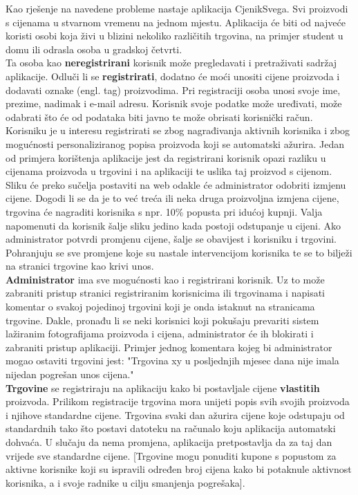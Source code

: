 		Kao rješenje na navedene probleme nastaje aplikacija CjenikSvega. Svi proizvodi s cijenama u stvarnom vremenu na jednom mjestu. Aplikacija će biti od najveće koristi osobi koja živi u blizini nekoliko različitih trgovina, na primjer student u domu ili odrasla osoba u gradskoj četvrti.\\
		
		Ta osoba kao \textbf{neregistrirani} korisnik može pregledavati i pretraživati sadržaj aplikacije. Odluči li se \textbf{registrirati}, dodatno će moći unositi cijene proizvoda i dodavati oznake (engl. tag) proizvodima. Pri registraciji osoba unosi svoje ime, prezime, nadimak i e-mail adresu. Korisnik svoje podatke može uređivati, može odabrati što će od podataka biti javno te može obrisati korisnički račun. Korisniku je u interesu registrirati se zbog nagrađivanja aktivnih korisnika i zbog mogućnosti personaliziranog popisa proizvoda koji se automatski ažurira. Jedan od primjera korištenja aplikacije jest da registrirani korisnik opazi razliku u cijenama proizvoda u trgovini i na aplikaciji te uslika taj proizvod s cijenom. Sliku će preko sučelja postaviti na web odakle će administrator odobriti izmjenu cijene. Dogodi li se da je to već treća ili neka druga proizvoljna izmjena cijene, trgovina će nagraditi korisnika s npr. 10\% popusta pri idućoj kupnji. Valja napomenuti da korisnik šalje sliku jedino kada postoji odstupanje u cijeni. Ako administrator potvrdi promjenu cijene, šalje se obavijest i korisniku i trgovini. Pohranjuju se sve promjene koje su nastale intervencijom korisnika te se to bilježi na stranici trgovine kao krivi unos.\\
		
		\textbf{Administrator} ima sve mogućnosti kao i registrirani korisnik. Uz to može zabraniti pristup stranici registriranim korisnicima ili trgovinama i napisati komentar o svakoj pojedinoj trgovini koji je onda istaknut na stranicama trgovine. Dakle, 
pronađu li se neki korisnici koji pokušaju prevariti sistem lažiranim fotografijama proizvoda i cijena, administrator će ih blokirati i zabraniti pristup aplikaciji. Primjer jednog komentara kojeg bi administrator mogao ostaviti trgovini jest: "Trgovina xy u posljednjih mjesec dana nije imala nijedan pogrešan unos cijena."\\
		
		\textbf{Trgovine} se registriraju na aplikaciju kako bi postavljale cijene \textbf{vlastitih} proizvoda. Prilikom registracije trgovina mora unijeti popis svih svojih proizvoda i njihove standardne cijene. Trgovina svaki dan ažurira cijene koje odstupaju od standardnih tako što postavi datoteku na računalo koju aplikacija automatski dohvaća. U slučaju da nema promjena, aplikacija pretpostavlja da za taj dan vrijede sve standardne cijene. [Trgovine mogu ponuditi kupone s popustom za aktivne korisnike koji su ispravili određen broj cijena kako bi potaknule aktivnost korisnika, a i svoje radnike u cilju smanjenja pogrešaka].\\
		
